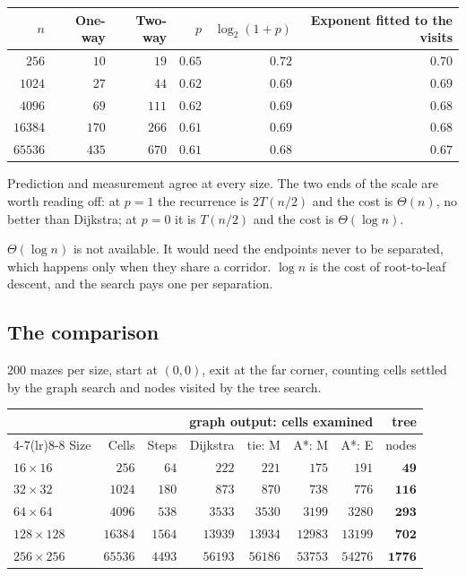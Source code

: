 \begin{center}
\begin{tabular}{@{}rrrrrr@{}}
  \toprule
  $n$ & One-way & Two-way & $p$ & $\log_2(1+p)$ & Exponent fitted to the visits \\
  \midrule
  $256$   & $10$  & $19$  & $0.65$ & $0.72$ & $0.70$ \\
  $1024$  & $27$  & $44$  & $0.62$ & $0.69$ & $0.69$ \\
  $4096$  & $69$  & $111$ & $0.62$ & $0.69$ & $0.68$ \\
  $16384$ & $170$ & $266$ & $0.61$ & $0.69$ & $0.68$ \\
  $65536$ & $435$ & $670$ & $0.61$ & $0.68$ & $0.67$ \\
  \bottomrule
\end{tabular}
\end{center}

Prediction and measurement agree at every size. The two ends of the scale are
worth reading off: at $p=1$ the recurrence is $2T(n/2)$ and the cost is
$\Theta(n)$, no better than Dijkstra; at $p=0$ it is $T(n/2)$ and the cost is
$\Theta(\log n)$.

\begin{keypoint}
$\Theta(\log n)$ is not available. It would need the endpoints never to be
separated, which happens only when they share a corridor. $\log n$ is the cost
of  root-to-leaf descent, and the search pays one per separation.
\end{keypoint}

\subsection{The comparison}

$200$ mazes per size, start at $(0,0)$, exit at the far corner, counting cells
settled by the graph search and nodes visited by the tree search.

\begin{center}
\begin{tabular}{@{}lrrrrrrr@{}}
  \toprule
  & & & \multicolumn{4}{c}{graph output: cells examined} & tree \\
  \cmidrule(lr){4-7}\cmidrule(lr){8-8}
  Size & Cells & Steps & Dijkstra & tie: M & A*: M & A*: E & nodes \\
  \midrule
  $16\times16$   & $256$   & $64$   & $222$   & $221$   & $175$   & $191$   & $\mathbf{49}$ \\
  $32\times32$   & $1024$  & $180$  & $873$   & $870$   & $738$   & $776$   & $\mathbf{116}$ \\
  $64\times64$   & $4096$  & $538$  & $3533$  & $3530$  & $3199$  & $3280$  & $\mathbf{293}$ \\
  $128\times128$ & $16384$ & $1564$ & $13939$ & $13934$ & $12983$ & $13199$ & $\mathbf{702}$ \\
  $256\times256$ & $65536$ & $4493$ & $56193$ & $56186$ & $53753$ & $54276$ & $\mathbf{1776}$ \\
  \bottomrule
\end{tabular}
\end{center}

